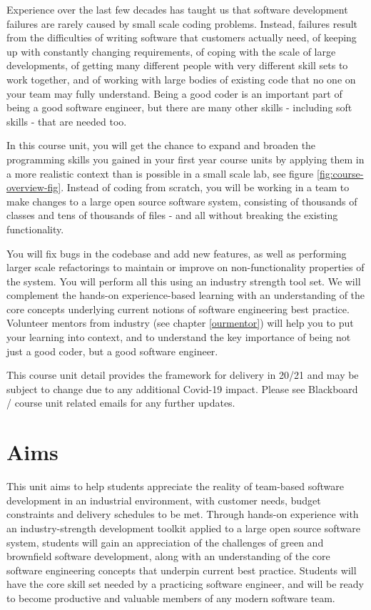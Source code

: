 \documentclass[
]{book}
\begin{document}
Experience over the last few decades has taught us that software development failures are rarely caused by small scale coding problems. Instead, failures result from the difficulties of writing software that customers actually need, of keeping up with constantly changing requirements, of coping with the scale of large developments, of getting many different people with very different skill sets to work together, and of working with large bodies of existing code that no one on your team may fully understand. Being a good coder is an important part of being a good software engineer, but there are many other skills - including soft skills - that are needed too.

In this course unit, you will get the chance to expand and broaden the programming skills you gained in your first year course units by applying them in a more realistic context than is possible in a small scale lab, see figure \ref{fig:course-overview-fig}. Instead of coding from scratch, you will be working in a team to make changes to a large open source software system, consisting of thousands of classes and tens of thousands of files - and all without breaking the existing functionality.

You will fix bugs in the codebase and add new features, as well as performing larger scale refactorings to maintain or improve on non-functionality properties of the system. You will perform all this using an industry strength tool set. We will complement the hands-on experience-based learning with an understanding of the core concepts underlying current notions of software engineering best practice. Volunteer mentors from industry (see chapter \ref{ourmentor}) will help you to put your learning into context, and to understand the key importance of being not just a good coder, but a good software engineer.

This course unit detail provides the framework for delivery in 20/21 and may be subject to change due to any additional Covid-19 impact. Please see Blackboard / course unit related emails for any further updates.

\hypertarget{bilo}{%
\section{Aims}\label{bilo}}

This unit aims to help students appreciate the reality of team-based software development in an industrial environment, with customer needs, budget constraints and delivery schedules to be met. Through hands-on experience with an industry-strength development toolkit applied to a large open source software system, students will gain an appreciation of the challenges of green and brownfield software development, along with an understanding of the core software engineering concepts that underpin current best practice. Students will have the core skill set needed by a practicing software engineer, and will be ready to become productive and valuable members of any modern software team.
\end{document}
